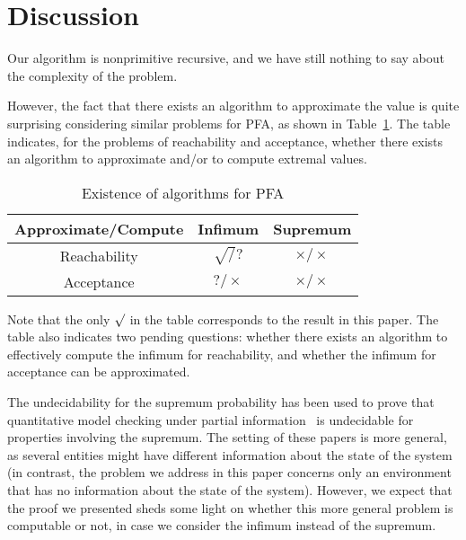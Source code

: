 \documentclass[final,3p,times,twocolumn]{elsarticle}
\theoremstyle{plain}
\theoremstyle{definition}
\newcommand{\recallTable}[1]{Table~\ref{#1}}
\begin{document}
\section{Discussion}

Our algorithm is nonprimitive recursive, and we have still nothing to say
about the complexity of the problem.

However, the fact that there exists an algorithm to approximate the value is
quite surprising considering similar problems for PFA, as shown in
\recallTable{tab:decidability}. The table indicates, for the problems of
reachability and acceptance, whether there exists an
algorithm to approximate and/or to compute extremal values.
\begin{table}
\centering
\footnotesize
\begin{tabular}{|c|c|c|}
\hline
Approximate/Compute &  Infimum & Supremum \cite{DBLP:journals/ai/MadaniHC03} \\
\hline
Reachability 		&	$\surd / ?$	& $\times /	\times$
									\\
\hline
Acceptance	\cite{DBLP:journals/mst/BlondelC03} & $? / \times$
												& $\times / \times$   \\
\hline
\end{tabular}
\caption{\label{tab:decidability}Existence of algorithms for PFA}
\end{table}
Note that the only $\surd$ in the table corresponds to the result in this
paper. The table also indicates two pending questions: whether there exists
an algorithm to effectively compute the infimum for reachability, and whether
the infimum for acceptance can be approximated.

The undecidability for the supremum probability has been used to prove that
quantitative model checking under partial
information~\cite{DBLP:conf/formats/GiroD07,DBLP:conf/sbmf/Giro09} is
undecidable for properties involving the supremum. The setting of these papers
is more general, as several entities might have different information about the
state of the system (in contrast, the problem we address in this paper concerns
only an environment that has no information about the state of the system).
However, we expect that the proof we presented sheds some light on whether this
more general problem is computable or not, in case we consider the infimum
instead of the supremum.



\end{document}
